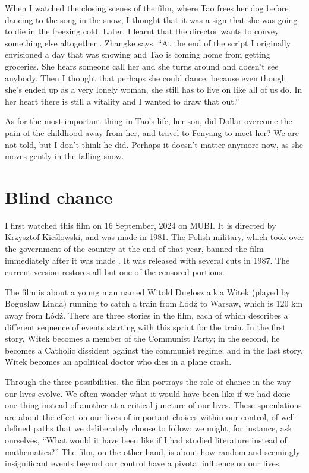 \documentclass{article}
\begin{document}
When I watched the closing scenes of the film, where Tao frees her dog
before dancing to the song in the snow, I thought that it was a sign
that she was going to die in the freezing cold.  Later, I learnt that
the director wants to convey something else altogether
\parencite{bib:6xz64ynw}.  Zhangke says, ``At the end of the script I
originally envisioned a day that was snowing and Tao is coming home
from getting groceries.  She hears someone call her and she turns
around and doesn’t see anybody.  Then I thought that perhaps she could
dance, because even though she’s ended up as a very lonely woman, she
still has to live on like all of us do.  In her heart there is still a
vitality and I wanted to draw that out.''

As for the most important thing in Tao's life, her son, did Dollar
overcome the pain of the childhood away from her, and travel to
Fenyang to meet her? We are not told, but I don't think he did.
Perhaps it doesn't matter anymore now, as she moves gently in the
falling snow.

\section{Blind chance}
\label{sec:7d7zho9u}

I first watched this film on 16 September, 2024 on MUBI.  It is
directed by Krzysztof Kie\'slowski, and was made in 1981.  The Polish
military, which took over the government of the country at the end of
that year, banned the film immediately after it was made
\parencite[p.~55]{bib:chlvcvbq}.  It was released with several cuts in
1987.  The current version restores all but one of the censored
portions.

The film is about a young man named Witold Duglosz a.k.a Witek (played
by Bogus\l{}aw Linda) running to catch a train from \L\'od\'z to
Warsaw, which is 120 km away from \L\'od\'z.  There are three stories
in the film, each of which describes a different sequence of events
starting with this sprint for the train.  In the first story, Witek
becomes a member of the Communist Party; in the second, he becomes a
Catholic dissident against the communist regime; and in the last
story, Witek becomes an apolitical doctor who dies in a plane crash.

Through the three possibilities, the film portrays the role of chance
in the way our lives evolve.  We often wonder what it would have been
like if we had done one thing instead of another at a critical
juncture of our lives.  These speculations are about the effect on our
lives of important choices within our control, of well-defined paths
that we deliberately choose to follow; we might, for instance, ask
ourselves, ``What would it have been like if I had studied literature
instead of mathematics?''  The film, on the other hand, is about how
random and seemingly insignificant events beyond our control have a
pivotal influence on our lives.
\end{document}
